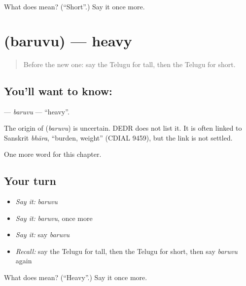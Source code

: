 \begin{tcolorbox}[breakable,colback=teal!4,colframe=teal!35!black,title={Before you move on}]
What does  mean? (\textquotedblleft{}Short\textquotedblright{}.) Say it once more.
\end{tcolorbox}
\section[\texorpdfstring{\te{బరువు} (baruvu)}{బరువు (baruvu)}]{ (baruvu) — heavy}

\label{lesson:TE-C136-baruvu}



\begin{quote}
Before the new one: say the Telugu for tall, then the Telugu for short.
\end{quote}

\subsection*{You'll want to know: }
\textbf{} — \emph{baruvu} — \textquotedblleft{}heavy\textquotedblright{}.

\begin{cousinweb}
The origin of \textbf{} (\emph{baruvu}) is uncertain. DEDR does not list it. It is often linked to Sanskrit \emph{bhāra}, \textquotedblleft{}burden, weight\textquotedblright{} (CDIAL 9459), but the link is not settled.
\end{cousinweb}

\begin{grammarlens}[title={What you've built}]
One more word for this chapter.
\end{grammarlens}

\subsection*{Your turn}
\begin{itemize}
\raggedright
  \item \emph{Say it:} \emph{baruvu}
  \item \emph{Say it:} \emph{baruvu}, once more
  \item \emph{Say it:} say \emph{baruvu}
  \item \emph{Recall:} say the Telugu for tall, then the Telugu for short, then say \emph{baruvu} again
\end{itemize}

\begin{tcolorbox}[breakable,colback=teal!4,colframe=teal!35!black,title={Before you move on}]
What does  mean? (\textquotedblleft{}Heavy\textquotedblright{}.) Say it once more.
\end{tcolorbox}
